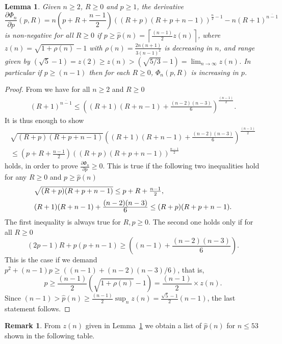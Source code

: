 \documentclass[11pt,a4paper,times]{amsart}
\theoremstyle{plain}
\newtheorem{lemma}[thm]{Lemma}
\theoremstyle{definition}
\newtheorem{remark}{Remark}[section]
\numberwithin{equation}{section}
\newcommand{\ds}{\displaystyle}
\newcommand{\eqskip}{ \vspace*{2mm}\\ }
\newcommand{\fr}[2]{\frac{\ds #1}{\ds #2}}
\newcommand{\txtg}{\textcolor{green}}
\begin{document}
{ \begin{lemma}\label{Dlemma1}
 Given $n\geq 2$,  $R\geq 0$ and  $p\geq 1$,  the derivative 
 \[\frac{\partial \Phi_n}{\partial p}(p,R) =
 n\left(p+R+\frac{n-1}{2}\right)\left((R+p)(R+p+n-1)\right)^{\frac{n}{2}-1}-n(R+1)^{\overline{n-1}}\]
is non-negative for all $R\geq 0$ if $p\geq
\hat{p}(n)=\left\lceil\frac{(n-1)}{2}z(n)\right\rceil$,
where $z(n)=\sqrt{1+\rho(n)}-1$ with $\rho(n)=\frac{2n(n+1)}{3(n-1)^2}$ is decreasing in $n$,  and  range given by
$(\sqrt{5}-1)=z(2)\geq z(n)> (\sqrt{5/3}-1)=\lim_{n\to \infty}z(n)$.  In particular if 
 $p\geq (n-1)$  then for each $R\geq 0$, $\Phi_n(p,R)$ is increasing in $p$.
 \end{lemma}
\begin{proof}
 From \cite[Lemma A.1]{fms} we have  {for all $n\geq 2$ and $R\geq 0$}
 \begin{gather}\label{A.1}
 (R+1)^{\overline{n-1}}\leq \left((R+1)(R+n-1)+\frac{(n-2)(n-3)}{6}\right)^{\frac{(n-1)}{2}}.
 \end{gather}
It is thus enough to show
\begin{gather*}
\sqrt{(R+p)(R+p+n-1)}\left((R+1)(R+n-1)+\fr{(n-2)(n-3)}{6}\right)^{\frac{(n-1)}{2}}\\
\leq \left(p+R+\frac{n-1}{2}\right)
\left((R+p)(R+p+n-1)\right)^{\frac{n-1}{2}}
\end{gather*} 
holds, in order to prove $\frac{\partial \Phi_n}{\partial p}\geq 0$.
This is true if  the following two inequalities hold for any $R\geq 0$ and $p\geq \hat{p}(n)$
\begin{eqnarray*}\begin{array}{l}
\sqrt{(R+p)(R+p+n-1)}\leq p+R+\frac{n-1}{2},\eqskip
  (R+1)(R+n-1)+\fr{(n-2)(n-3)}{6} \leq (R+p)(R+p+n-1).
  \end{array}
  \end{eqnarray*}
The first inequality is always true for $R, p\geq 0$. The second one holds only if
for all $R\geq 0$
\[(2p-1)R +p(p+n-1)\geq \left((n-1)+\frac{(n-2)(n-3)}{6}\right). \]
This is the case if we demand
$p^2+(n-1)p\geq \left((n-1)+{(n-2)(n-3)}/{6}\right)$, 
that is,
\[p\geq \frac{(n-1)}{2}\left(\sqrt{1+ \rho(n) }
-1\right)=\frac{(n-1)}{2}\times z(n).\]
Since
$(n-1)> \hat{p}(n)\geq \frac{(n-1)}{2}\sup_n z(n)= \frac{\sqrt{5}-1}{2}(n-1)$, the last statement follows.
 \end{proof}
 \begin{remark} \label{8.1} From  $z(n)$ given in Lemma~\ref{Dlemma1} we obtain a list of $\hat{p}(n)$ for $n\leq 53$
 shown in the following table.

\end{remark}}
\end{document}
